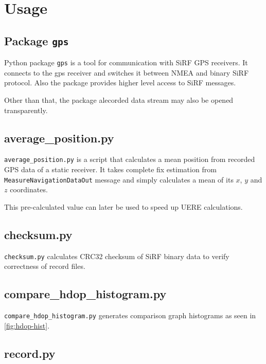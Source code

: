\chapter{Usage}
\label{chap:usage}

\section{Package \lstinline=gps=}
\label{sec:package-gps}

Python package \lstinline=gps= is a tool for communication with SiRF GPS receivers.
It connects to the gps receiver and switches it between NMEA and binary SiRF protocol.
Also the package provides higher level access to SiRF messages.

Other than that, the package alecorded data stream may also be opened transparently.

\section{average\_position.py}
\label{sec:usage-average-position-py}



\verb=average_position.py= is a script that calculates a mean position from recorded
GPS data of a static receiver.
It takes complete fix estimation from \verb=MeasureNavigationDataOut= message and simply
calculates a mean of its \(x\), \(y\) and \(z\) coordinates.

This pre-calculated value can later be used to speed up UERE calculations.

\section{checksum.py}
\label{sec:usage-checksum-py}


\verb=checksum.py= calculates CRC32 checksum of SiRF binary data to verify
correctness of record files.

\section{compare\_hdop\_histogram.py}


\verb=compare_hdop_histogram.py= generates comparison graph histograms as seen in
\cref{fig:hdop-hist}.

\section{record.py}

